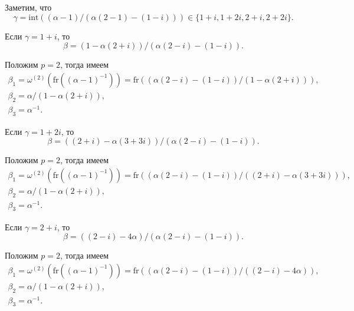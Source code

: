 \documentclass[_00_dissertation.tex]{subfiles}
\begin{document}
\begin{example}
    Заметим, что
    \begin{equation*}
        \gamma=\textrm{int}((\alpha-1)/(\alpha(2-1)-(1-i)))\in\{1+i,1+2i,2+i,2+2i\}.
    \end{equation*}

    Если $\gamma=1+i$, то
    \begin{equation*}
        \beta=(1-\alpha(2+i))/(\alpha(2-i)-(1-i)).
    \end{equation*}

    Положим $p=2$, тогда имеем
    \begin{equation*}
        \begin{array}{c}
            \beta_1=\omega^{(2)}(\textrm{fr}((\alpha-1)^{-1}))=\textrm{fr}((\alpha(2-i)-(1-i))/(1-\alpha(2+i))),\\
            \beta_2=\alpha/(1-\alpha(2+i)),\\
            \beta_3=\alpha^{-1}.
        \end{array}
    \end{equation*}

    Если $\gamma=1+2i$, то
    \begin{equation*}
        \beta=((2+i)-\alpha(3+3i))/(\alpha(2-i)-(1-i)).
    \end{equation*}

    Положим $p=2$, тогда имеем
    \begin{equation*}
        \begin{array}{c}
            \beta_1=\omega^{(2)}(\textrm{fr}((\alpha-1)^{-1}))=\textrm{fr}((\alpha(2-i)-(1-i))/((2+i)-\alpha(3+3i))),\\
            \beta_2=\alpha/(1-\alpha(2+i)),\\
            \beta_3=\alpha^{-1}.
        \end{array}
    \end{equation*}

    Если $\gamma=2+i$, то
    \begin{equation*}
        \beta=((2-i)-4\alpha)/(\alpha(2-i)-(1-i)).
    \end{equation*}

    Положим $p=2$, тогда имеем
    \begin{equation*}
        \begin{array}{c}
            \beta_1=\omega^{(2)}(\textrm{fr}((\alpha-1)^{-1}))=\textrm{fr}((\alpha(2-i)-(1-i))/((2-i)-4\alpha)),\\
            \beta_2=\alpha/(1-\alpha(2+i)),\\
            \beta_3=\alpha^{-1}.
        \end{array}
    \end{equation*}


\end{example}
\end{document}
